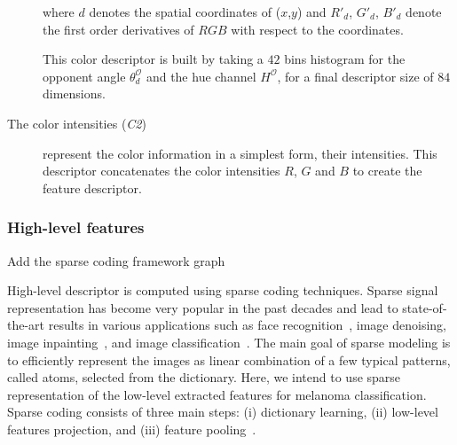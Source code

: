 \begin{description}
\noindent where $d$ denotes the spatial coordinates of ($x$,$y$) and $R'_{d}$, $G'_{d}$, $B'_{d}$ denote the first order derivatives of $RGB$ with respect to the coordinates.

This color descriptor is built by taking a $42$ bins histogram for the opponent angle $\theta^{\mathcal{O}}_{d}$ and the hue channel $H^{\mathcal{O}}$, for a final descriptor size of $84$ dimensions.

\item[The color intensities (\emph{C2})] represent the color information in a simplest form, their intensities.
This descriptor concatenates the color intensities $R$, $G$ and $B$ to create the feature descriptor.
\end{description}

\subsubsection{High-level features}

{\color{red} Add the sparse coding framework graph}

High-level descriptor is computed using sparse coding techniques. Sparse signal representation has become very popular in the past decades and lead to state-of-the-art results in various applications such as face recognition~\cite{wright2009robust}, image denoising, image inpainting~\cite{elad2006image}, and image classification~\cite{sidibe2015discrimination}. The main goal of sparse modeling is to efficiently represent the images as linear combination of a few typical patterns, called atoms, selected from the dictionary. Here, we intend to use sparse representation of the low-level extracted features for melanoma classification. Sparse coding consists of three main steps: (i) dictionary learning, (ii) low-level features projection, and (iii) feature pooling~\cite{rubinstein2008efficient}.


